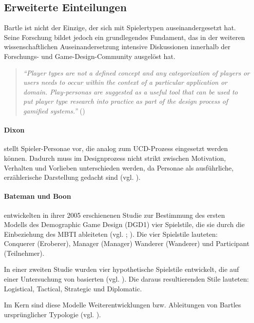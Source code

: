 \subsection{Erweiterte Einteilungen}
Bartle ist nicht der Einzige, der sich mit Spielertypen auseinandergesetzt hat. Seine Forschung bildet jedoch ein grundlegendes Fundament, das in der weiteren wissenschaftlichen Auseinandersetzung intensive Diskussionen innerhalb der Forschungs- und Game-Design-Community ausgelöst hat. 
\begin{quote}
    \textit{
        \enquote{Player types are not a defined concept and any categorization of players or users needs to occur within the context of a particular application or domain. Play-personas are suggested as a useful tool that can be used to put player type research into practice as part of the design process of gamified systems.}
    } 
    (\cite{dixon_player_nodate})
\end{quote}

\paragraph{Dixon} 
stellt Spieler-Personae vor, die analog zum \ac{UCD}-Prozess eingesetzt werden können. Dadurch muss im Designprozess nicht strikt zwischen Motivation, Verhalten und Vorlieben unterschieden werden, da Personae als ausführliche, erzählerische Darstellung gedacht sind (vgl. \cite{dixon_player_nodate}).

\paragraph{Bateman und Boon}
entwickelten in ihrer 2005 erschienenen Studie zur Bestimmung des ersten Modells des Demographic Game Design (DGD1) vier Spielstile, die sie durch die Einbeziehung des \ac{MBTI} ableiteten (vgl. \cite{noauthor_mbti_nodate}; \cite{bateman_21st_2005}).
Die vier Spielstile lauteten: Conquerer (Eroberer), Manager (Manager) Wanderer (Wanderer) und Participant (Teilnehmer).

In einer zweiten Studie wurden vier hypothetische Spielstile entwickelt, die auf einer Untersuchung von \cite{berens_understanding_2000} basierten (vgl. \cite{bateman_player_2012}). Die daraus resultierenden Stile lauteten: Logistical, Tactical, Strategic und Diplomatic.

Im Kern sind diese Modelle Weiterentwicklungen bzw. Ableitungen von Bartles ursprünglicher Typologie (vgl. \cite{ludologie_spielertypen_nodate}).


